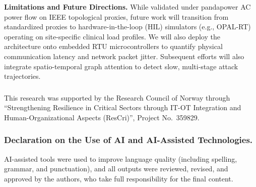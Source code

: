\documentclass[runningheads]{llncs}
\begin{document}
\textbf{Limitations and Future Directions.}
While validated under pandapower AC power flow on IEEE topological proxies, future work will transition from standardized proxies to hardware-in-the-loop (HIL) simulators (e.g., OPAL-RT) operating on site-specific clinical load profiles.
We will also deploy the architecture onto embedded RTU microcontrollers to quantify physical communication latency and network packet jitter.
Subsequent efforts will also integrate spatio-temporal graph attention to detect slow, multi-stage attack trajectories.

\begin{credits}
\subsubsection{\ackname}
This research was supported by the Research Council of Norway through ``Strengthening Resilience in Critical Sectors through IT-OT Integration and Human-Organizational Aspects (ResCri)'', Project No.~359829.

\subsubsection*{Declaration on the Use of AI and AI-Assisted Technologies.}
AI-assisted tools were used to improve language quality (including spelling, grammar, and punctuation), and all outputs were reviewed, revised, and approved by the authors, who take full responsibility for the final content.
\end{credits}



\end{document}
